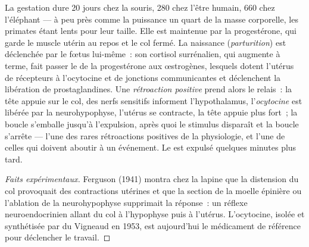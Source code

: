 \begin{proposition}\label{prop:b2:mammal-reproduction:birth}
La gestation dure \num{20} jours chez la souris, \num{280} chez l'être
humain, \num{660}
chez l'éléphant --- à peu près comme la puissance un quart de la masse
corporelle, les primates étant lents pour leur taille. Elle est
maintenue par la progestérone, qui garde le muscle utérin au repos et le
col fermé. La naissance (\emph{parturition}) est déclenchée par le fœtus
lui-même~: son cortisol surrénalien, qui augmente à terme, fait passer le
 de la progestérone aux œstrogènes, lesquels dotent l'utérus de
récepteurs à l'ocytocine et de jonctions communicantes et déclenchent
la libération de prostaglandines. Une \emph{rétroaction positive} prend
alors le relais~: la tête appuie sur le col, des nerfs sensitifs
informent l'hypothalamus, l'\emph{ocytocine} est libérée par la
neurohypophyse, l'utérus se contracte, la tête appuie plus fort~; la
boucle s'emballe jusqu'à l'expulsion, après quoi le stimulus disparaît
et la boucle s'arrête --- l'une des rares rétroactions positives de la
physiologie, et l'une de celles qui doivent aboutir à un événement. Le
 est expulsé quelques minutes plus tard.
\end{proposition}
\begin{proof}[Faits expérimentaux]
Ferguson (1941) montra chez la lapine que la distension du col
provoquait des contractions utérines et que la section de la moelle
épinière ou l'ablation de la neurohypophyse supprimait la réponse~: un
réflexe neuroendocrinien allant du col à l'hypophyse puis à l'utérus.
L'ocytocine, isolée et synthétisée par du Vigneaud en 1953, est
aujourd'hui le médicament de référence pour déclencher le travail.
\end{proof}

